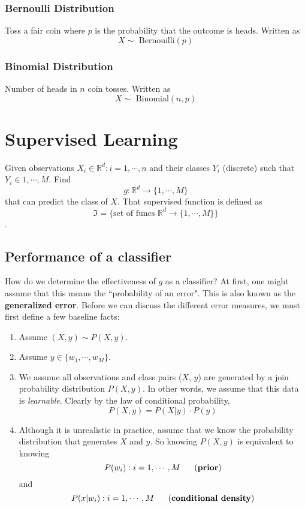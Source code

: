 \documentclass[12pt]{article}
\begin{document}
\subsubsection{Bernoulli Distribution}
Toss a fair coin where $p$ is the probability that the outcome is heads. Written as \[X \sim\text{ Bernouilli}(p)\]

\subsubsection{Binomial Distribution}
Number of heads in $n$ coin tosses. Written as \[X \sim\text{ Binomial}(n, p)\]

\section{Supervised Learning}

Given observations $X_i \in \mathbb{R}^d; i=1, \cdots, n$ and their classes $Y_i$ (discrete) such that $Y_i \in {1, \cdots, M}$. Find \[g : \mathbb{R}^d \rightarrow \{1, \cdots, M\}\] that can predict the class of $X$. That supervised function is defined as \[\Im = \{\text{set of funcs } \mathbb{R}^d \rightarrow \{1, \cdots, M\}\}\].

\subsection{Performance of a classifier}

How do we determine the effectiveness of $g$ as a classifier? At first, one might assume that this means the ``probability of an error". This is also known as the \textbf{generalized error}. Before we can discuss the different error measures, we must first define a few baseline facts:

\begin{enumerate}
\item Assume $(X, y) \sim P(X, y)$. 
\item Assume $y \in \{w_1, \cdots, w_M\}$.
\item We assume all observations and class pairs ($X$, $y$) are generated by a join probability distribution $P(X, y)$. In other words, we assume that this data is \textit{learnable}. Clearly by the law of conditional probability, \[P(X, y) = P(X | y) \cdot P(y)\]
\item Although it is unrealistic in practice, assume that we know the probability distribution that generates $X$ and $y$. So knowing $P(X, y)$ is equivalent to knowing \[P(w_i) : i=1, \cdots, M\text{~~~~~(\textbf{prior})}\] and \[P(x | w_i) : i=1, \cdots, M\text{~~~~~(\textbf{conditional density})}\]
\end{enumerate}
\end{document}
